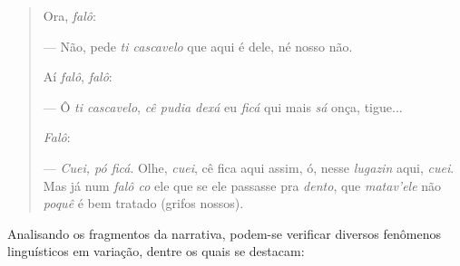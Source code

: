 \documentclass[portuguese]{textolivre}
\begin{document}
\begin{quote}
Ora, \textit{falô}:

— Não, pede \textit{ti cascavelo} que aqui é dele, né nosso não.

Aí \textit{falô}, \textit{falô}:

— Ô \textit{ti cascavelo}, \textit{cê pudia dexá} eu \textit{ficá} qui mais \textit{sá} onça, tigue...

\textit{Falô}:

— \textit{Cuei, pó ficá}. Olhe, \textit{cuei}, cê fica aqui assim, ó, nesse \textit{lugazin} aqui, \textit{cuei}. Mas já num \textit{falô co} ele que se ele passasse pra \textit{dento}, que \textit{matav’ele} não \textit{poquê} é bem tratado (grifos nossos).
\end{quote}

Analisando os fragmentos da narrativa, podem-se verificar diversos fenômenos linguísticos em variação, dentre os quais se destacam:
\end{document}
